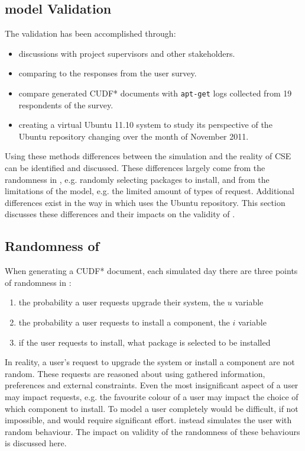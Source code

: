 \subsection{\usermodel model Validation}
\label{sim.modelvalidation}
The \usermodel validation has been accomplished through:
\begin{itemize}
  \item discussions with project supervisors and other stakeholders.
  \item comparing \usermodel to the responses from the user survey.
  \item compare generated CUDF* documents with \texttt{apt-get} logs collected from 19 respondents of the survey.
  \item creating a virtual Ubuntu 11.10 system to study its perspective of the Ubuntu repository changing over the month of November 2011.
\end{itemize}

Using these methods differences between the simulation and the reality of CSE can be identified and discussed.
These differences largely come from the randomness in \usermodel, e.g. randomly selecting packages to install,
and from the limitations of the model, e.g. the limited amount of types of request.
Additional differences exist in the way in which \usermodel uses the Ubuntu repository.
This section discusses these differences and their impacts on the validity of \usermodel.

\subsection{Randomness of \usermodel}
When generating a CUDF* document, each simulated day there are three points of randomness in \usermodel:
\begin{enumerate}
  \item the probability a user requests upgrade their system, the $u$ variable
  \item the probability a user requests to install a component, the $i$ variable
  \item if the user requests to install, what package is selected to be installed
\end{enumerate}
In reality, a user's request to upgrade the system or install a component are not random.
These requests are reasoned about using gathered information, preferences and external constraints.
Even the most insignificant aspect of a user may impact requests, e.g. the favourite colour of a user may impact the choice of which component to install.
To model a user completely would be difficult, if not impossible, and would require significant effort.
\usermodel instead simulates the user with random behaviour.
The impact on validity of the randomness of these behaviours is discussed here.

